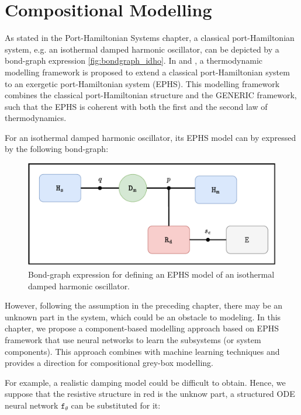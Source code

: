 \documentclass[
	parskip, 			   %
	twoside, 			   %
	DIV=14, 			   %
	BCOR=15.0mm, 		   %
	headsepline, 		   %
	open=right, 		   %
	captions=tableheading, %
	bibliography=totoc,    %
	numbers=noenddot       %
]{scrreprt}
\begin{document}
\clearpage
\chapter{Compositional Modelling}
\label{ch:chapter7}

As stated in the Port-Hamiltonian Systems chapter, a classical port-Hamiltonian system, e.g. an isothermal damped harmonic oscillator, can be depicted by a bond-graph expression \ref{fig:bondgraph_idho}. In \cite{lohmayer2022exergetic} and \cite{lohmayer2022ephs}, a thermodynamic modelling framework is proposed to extend a classical port-Hamiltonian system to an exergetic port-Hamiltonian system (EPHS). This modelling framework combines the classical port-Hamiltonian structure and the GENERIC framework, such that the EPHS is coherent with both the first and the second law of thermodynamics.

For an isothermal damped harmonic oscillator, its EPHS model can by expressed by the following bond-graph:

\begin{figure}[h!]
    \centering
    \includegraphics[scale=0.6]{figures/bondgraph_idho_exergetic.pdf}
    \caption{Bond-graph expression for defining an EPHS model of an isothermal damped harmonic oscillator.}
    \label{fig:bondgraph_idho_exergetic}
\end{figure}

However, following the assumption in the preceding chapter, there may be an unknown part in the system, which could be an obstacle to modeling. In this chapter, we propose a component-based modelling approach based on EPHS framework that use neural networks to learn the subsystems (or system components). This approach combines with machine learning techniques and provides a direction for compositional grey-box modelling.

For example, a realistic damping model could be difficult to obtain. Hence, we suppose that the resistive structure in red is the unknow part, a structured ODE neural network $\mathtt{f_{\theta}}$ can be substituted for it:
\end{document}
